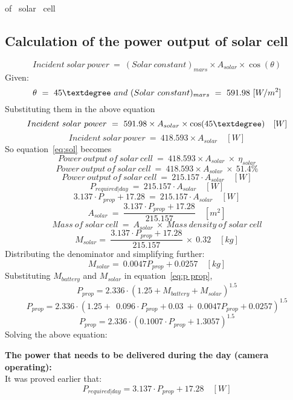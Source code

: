 of \ solar \ cell \] \subsection{Calculation of the power output of solar cell}  \[ Incident \ solar \ power \ = \ (Solar\ constant)_{mars} \times A_{solar} \times \cos(\theta) \]  Given: \[ \theta \ = \ 45 \textdegree \ and \  (Solar\ constant)_{mars} \ = \ 591.98 \ [W/m^2] \] Substituting them in the above equation \[ Incident \ solar \ power \ = \ 591.98 \times A_{solar} \times \cos(45\textdegree) \quad [W] \] \[ Incident \ solar \ power \ = \ 418.593 \times A_{solar} \quad [W] \] So equation~\ref{eq:sol} becomes \[ Power \ output \ of \ solar \ cell \ = \ 418.593 \times A_{solar} \ \times \ \eta_{solar} \] \[ Power \ output \ of \ solar \ cell \ = \ 418.593 \times A_{solar} \ \times \ 51.4\% \] \[ Power \ output \ of \ solar \ cell \ = \ 215.157 \cdot A_{solar} \quad [W] \] \[ P_{required|day} \ = \ 215.157 \cdot A_{solar} \quad [W] \] \[ 3.137 \cdot P_{prop} + 17.28 \ = \ 215.157 \cdot A_{solar} \quad [W] \] \[ A_{solar} \ = \ \frac{ 3.137 \cdot P_{prop} + 17.28 }{ 215.157 } \quad [m^2] \] \[ Mass \ of \ solar \ cell \ = \ A_{solar} \ \times \ Mass \ density \ of \ solar \ cell \] \[ M_{solar} = \ \frac{ 3.137 \cdot P_{prop} + 17.28 }{ 215.157 } \ \times \ 0.32 \quad [kg] \] Distributing the denominator and simplifying further: \[ M_{solar} = \ 0.0047 P_{prop} + 0.0257  \quad [kg] \] \vspace{0.5cm} \p Substituting $ M_{battery} $ and $ M_{solar} $ in equation~\ref{eq:p prop}, \[
P_{prop} = 2.336 \cdot (1.25 + M_{battery} + M_{solar})^{1.5} \] \[ P_{prop} = 2.336 \cdot (1.25 + \ \ 0.096 \cdot P_{prop} + 0.03 \ + \ 0.0047 P_{prop} + 0.0257 )^{1.5} \] \[ P_{prop} = 2.336 \cdot ( 0.1007 \cdot P_{prop} + 1.3057 )^{1.5} \] Solving the above equation: \begin{center}  \end{center} \vspace{1cm} \p \textbf{The power that needs to be delivered during the day (camera operating):} \vspace{0.1cm}\\ It was proved earlier that: \[ P_{required|day} = 3.137 \cdot P_{prop} + 17.28 \quad [W] \]

